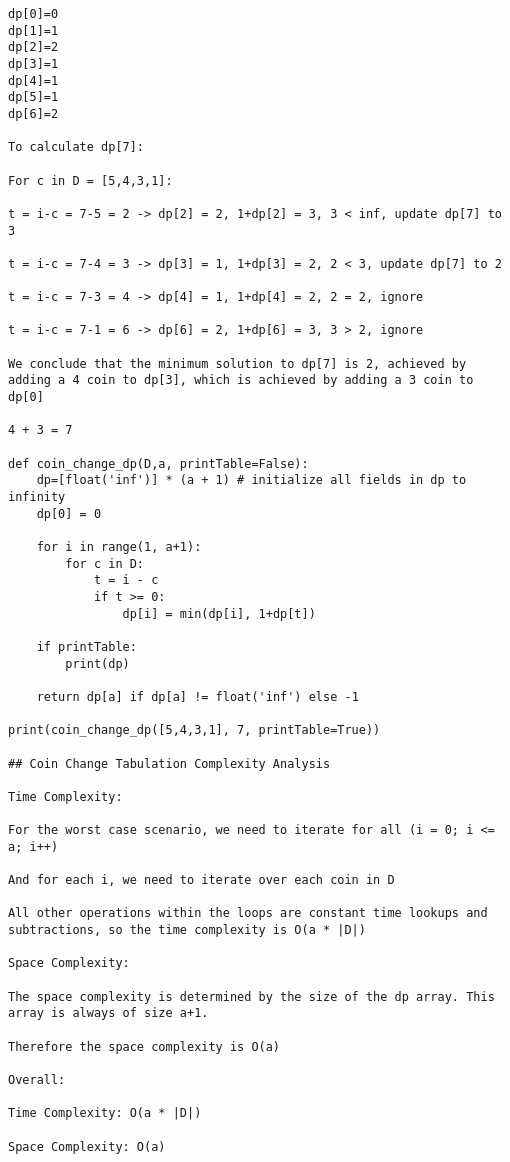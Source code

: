 \begin{verbatim}
dp[0]=0
dp[1]=1
dp[2]=2
dp[3]=1
dp[4]=1
dp[5]=1
dp[6]=2

To calculate dp[7]:

For c in D = [5,4,3,1]:

t = i-c = 7-5 = 2 -> dp[2] = 2, 1+dp[2] = 3, 3 < inf, update dp[7] to 3

t = i-c = 7-4 = 3 -> dp[3] = 1, 1+dp[3] = 2, 2 < 3, update dp[7] to 2

t = i-c = 7-3 = 4 -> dp[4] = 1, 1+dp[4] = 2, 2 = 2, ignore

t = i-c = 7-1 = 6 -> dp[6] = 2, 1+dp[6] = 3, 3 > 2, ignore

We conclude that the minimum solution to dp[7] is 2, achieved by adding a 4 coin to dp[3], which is achieved by adding a 3 coin to dp[0]

4 + 3 = 7

def coin_change_dp(D,a, printTable=False):
    dp=[float('inf')] * (a + 1) # initialize all fields in dp to infinity 
    dp[0] = 0

    for i in range(1, a+1):
        for c in D:
            t = i - c
            if t >= 0:
                dp[i] = min(dp[i], 1+dp[t])

    if printTable:
        print(dp)

    return dp[a] if dp[a] != float('inf') else -1

print(coin_change_dp([5,4,3,1], 7, printTable=True))

## Coin Change Tabulation Complexity Analysis

Time Complexity:

For the worst case scenario, we need to iterate for all (i = 0; i <= a; i++)

And for each i, we need to iterate over each coin in D

All other operations within the loops are constant time lookups and subtractions, so the time complexity is O(a * |D|)

Space Complexity:

The space complexity is determined by the size of the dp array. This array is always of size a+1.

Therefore the space complexity is O(a)

Overall:

Time Complexity: O(a * |D|)

Space Complexity: O(a)


\end{verbatim}